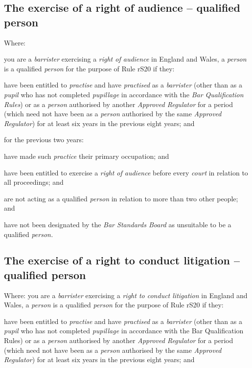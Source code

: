 \subsection{The exercise of a right of audience -- qualified person}
\item Where:
\al
\item you are a \emph{barrister} exercising a \emph{right of audience} in
England and Wales, a \emph{person} is a qualified \emph{person} for the
purpose of Rule rS20 if they:
\begin{romlist}
\item have been entitled to \emph{practise} and have \emph{practised} as a
\emph{barrister} (other than as a \emph{pupil} who has not completed
\emph{pupillage} in accordance with the \emph{Bar Qualification Rules})
or as a \emph{person} authorised by another \emph{Approved Regulator}
for a period (which need not have been as a \emph{person} authorised by
the same \emph{Approved Regulator}) for at least six years in the
previous eight years; and

\item for the previous two years:
\begin{numlist}
\item have made such \emph{practice} their primary occupation; and

\item have been entitled to exercise a \emph{right of audience} before
every \emph{court} in relation to all proceedings; and

\item are not acting as a qualified \emph{person} in relation to more
than two other people; and \end{numlist}

\item have not been designated by the \emph{Bar Standards Board} as
unsuitable to be a qualified \emph{person.}
\end{romlist}\la
\subsection{The exercise of a right to conduct litigation -- qualified
person}
\item Where:
\all you are a \emph{barrister} exercising a \emph{right to conduct
litigation} in England and Wales, a \emph{person} is a qualified
\emph{person} for the purpose of Rule rS20 if they:

\rl\item have been entitled to \emph{practise} and have \emph{practised} as a
\emph{barrister} (other than as a \emph{pupil} who has not completed
\emph{pupillage} in accordance with the Bar Qualification Rules) or as a
\emph{person} authorised by another \emph{Approved Regulator} for a
period (which need not have been as a \emph{person} authorised by the
same \emph{Approved Regulator}) for at least six years in the previous
eight years; and

